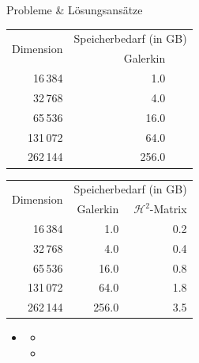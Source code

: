 \documentclass[10pt]{beamer}
\begin{document}
\begin{frame}{Probleme \& Lösungsansätze}
  \begin{overprint}
      \begin{table}[h]
        \begin{tabular}{rrr} \toprule
          \multirow{2}{*}{Dimension} & \multicolumn{2}{c}{Speicherbedarf (in 
          GB)} \\ \cmidrule{2-3}
                      & Galerkin & \\ \midrule
              16\,384 &      1.0 & \\
              32\,768 &      4.0 & \\
              65\,536 &     16.0 & \\
             131\,072 &     64.0 & \\
             262\,144 &    256.0 & \\ \bottomrule
        \end{tabular}
      \end{table}
      \begin{table}[h]
        \begin{tabular}{rrr} \toprule
          \multirow{2}{*}{Dimension} & \multicolumn{2}{c}{Speicherbedarf (in 
          GB)} \\ \cmidrule{2-3}
                      & Galerkin & \(\mathcal{H}^2\)-Matrix \\ \midrule
              16\,384 &      1.0 & 0.2 \\
              32\,768 &      4.0 & 0.4 \\
              65\,536 &     16.0 & 0.8 \\
             131\,072 &     64.0 & 1.8 \\
             262\,144 &    256.0 & 3.5 \\ \bottomrule
        \end{tabular}
      \end{table}
  \end{overprint}

  \begin{itemize}
    \item {}
    \begin{itemize}
      \item {}
      \item {}
    \end{itemize}
  \end{itemize}
\end{frame}
\end{document}
